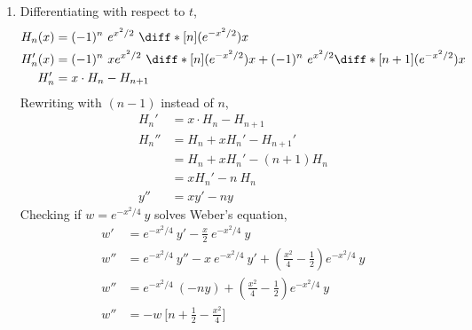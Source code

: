 \begin{enumerate}
\begin{enumerate}
              \item Differentiating with respect to $ t $,
                    \begin{align}
                        H_n(x)   & = (-1)^n\ e^{x^2/2} \ \diff*[n]{(e^{-x^2/2})}{x}  \\
                        H_n' (x) & = (-1)^n\ xe^{x^2/2} \ \diff*[n]{(e^{-x^2/2})}{x}
                        + (-1)^n\ e^{x^2/2} \diff*[n+1]{(e^{-x^2/2})}{x}             \\
                        H_n'     & = x \cdot H_n - H_{n+1}
                    \end{align}
                    Rewriting with $ (n-1) $ instead of $ n $,
                    \begin{align}
                        H_{n}'  & = x \cdot H_{n} - H_{n+1}      \\
                        H_{n}'' & = H_{n} + xH_{n}' - H_{n+1}'   \\
                                & = H_{n} + xH_{n}' - (n+1)H_{n} \\
                                & = xH_{n}' - n\ H_{n}           \\
                        y''     & = xy' - ny
                    \end{align}
                    Checking if $ w = e^{-x^2/4}\ y $ solves Weber's equation,
                    \begin{align}
                        w'  & = e^{-x^2/4}\ y' - \frac{x}{2}\ e^{-x^2/4}\ y       \\
                        w'' & = e^{-x^2/4}\ y'' - x\ e^{-x^2/4}\ y' +
                        \left( \frac{x^2}{4} - \frac{1}{2} \right)e^{-x^2/4}\ y   \\
                        w'' & = e^{-x^2/4}\ (-ny) +
                        \left( \frac{x^2}{4} - \frac{1}{2} \right)e^{-x^2/4}\ y   \\
                        w'' & = -w\ \Bigg[ n + \frac{1}{2} - \frac{x^2}{4} \Bigg]
                    \end{align}
          \end{enumerate}


\end{enumerate}
